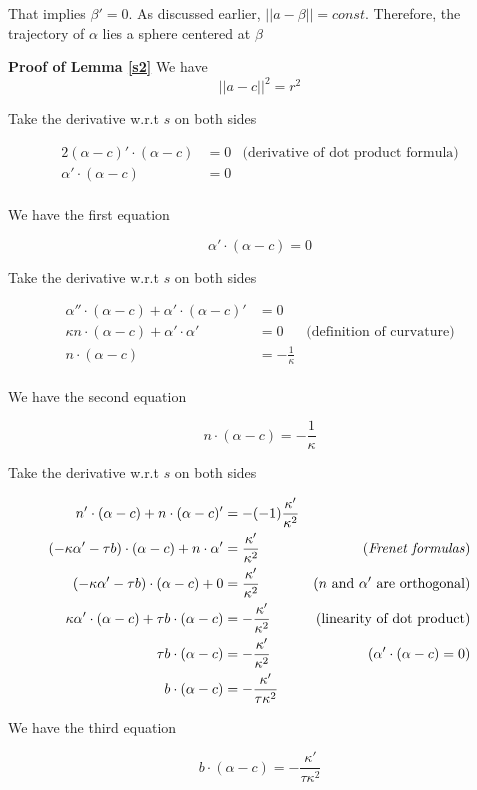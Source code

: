 \documentclass{article}
\begin{document}
That implies $\beta' = 0$. As discussed earlier, $||a - \beta|| = const$. Therefore, the trajectory of $\alpha$ lies a sphere centered at $\beta$

\textbf{Proof of Lemma \ref{s2}}
We have
$$
    ||a - c||^2 = r^2
$$

Take the derivative w.r.t $s$ on both sides

\begin{align*}
    2 (\alpha - c)' \cdot (\alpha - c) &= 0 &\text{(derivative of dot product formula)}\\
    \alpha' \cdot (\alpha - c) &= 0 \\
\end{align*}

We have the first equation

$$
    \alpha' \cdot (\alpha - c) = 0
$$
    
Take the derivative w.r.t $s$ on both sides

\begin{align*}
    \alpha'' \cdot (\alpha - c) + \alpha' \cdot (\alpha - c)' &= 0 \\
    \kappa n \cdot (\alpha - c) + \alpha' \cdot \alpha' &= 0 &\text{(definition of curvature)}\\
    n \cdot (\alpha - c) &= -\frac{1}{\kappa}\\
\end{align*}

We have the second equation

$$
    n \cdot (\alpha - c) = -\frac{1}{\kappa}
$$


Take the derivative w.r.t $s$ on both sides

\begin{align*}
    n' \cdot (\alpha - c) + n \cdot (\alpha - c)' &= - (-1) \frac{\kappa'}{\kappa^2} \\
    (-\kappa \alpha' - \tau b) \cdot (\alpha - c) + n \cdot \alpha' &= \frac{\kappa'}{\kappa^2} &\text{(\emph{Frenet formulas})} \\
    (-\kappa \alpha' - \tau b) \cdot (\alpha - c) + 0 &= \frac{\kappa'}{\kappa^2} &\text{($n$ and $\alpha'$ are orthogonal)} \\
    \kappa \alpha' \cdot (\alpha - c) + \tau b \cdot (\alpha - c) &= - \frac{\kappa'}{\kappa^2} &\text{(linearity of dot product)}\\
    \tau b \cdot (\alpha - c) &= - \frac{\kappa'}{\kappa^2} &\text{($\alpha' \cdot (\alpha - c) = 0$)}\\
    b \cdot (\alpha - c) &= - \frac{\kappa'}{\tau \kappa^2} \\
\end{align*}

We have the third equation

$$
    b \cdot (\alpha - c) = - \frac{\kappa'}{\tau \kappa^2}
$$
\end{document}
